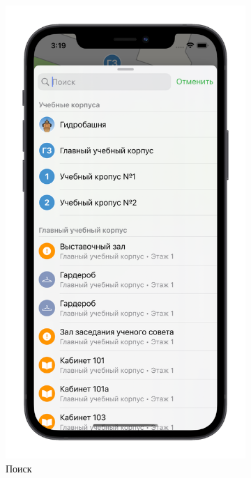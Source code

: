   \begin{figure}[H]
    \centering
    \begin{subfigure}[b]{0.3\textwidth}
      \centering
      \includegraphics[width=\textwidth]{assets/appendix/ios-result/search.png}
      \caption{Поиск}
    \end{subfigure}
    \hfill
    \begin{subfigure}[b]{0.3\textwidth}

\end{subfigure}
\end{figure}
